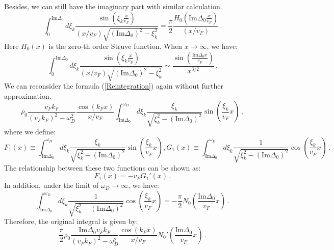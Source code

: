 \documentclass[aps,onecolumn,nofootinbib,superscriptaddress,notitlepage,longbibliography]{revtex4-1}
\begin{document}
Besides, we can still have the imaginary part with similar calculation.
\begin{equation}
\int_{0}^{\text{Im}\Delta_{0}}d\xi_{k}\frac{\sin\left(\xi_{k}\frac{x}{v_{F}}\right)}{(x/v_{F})\sqrt{\left(\text{Im}\Delta_{0}\right)^{2}-\xi_{k}^{2}}}=\frac{\pi}{2}\frac{H_{0}\left(\text{Im}\Delta_{0}\frac{x}{v_{F}}\right)}{(x/v_{F})}\,.
\end{equation}
Here $H_{0}(x)$ is the zero-th order Struve function. When $x\rightarrow\infty$,
we have: 
\begin{equation}
\int_{0}^{\text{Im}\Delta_{0}}d\xi_{k}\frac{\sin\left(\xi_{k}\frac{x}{v_{F}}\right)}{(x/v_{F})\sqrt{\left(\text{Im}\Delta_{0}\right)^{2}-\xi_{k}^{2}}}\sim\frac{\sin(\frac{\text{Im}\Delta_{0}x}{v_{F}})}{x^{3/2}}\,.\label{Imapprox}
\end{equation}
We can reconsider the formula (\ref{Reintegration}) again without
further approximation. 
\begin{equation}
\rho_{0}\frac{v_{F}k_{F}}{(v_{F}k_{F})^{2}-\omega_{D}^{2}}\frac{\cos(k_{F}x)}{x/v_{F}}\int_{\text{Im}\Delta_{0}}^{\omega_{D}}d\xi_{k}\frac{\xi_{k}}{\sqrt{\xi_{k}^{2}-(\text{Im}\Delta_{0})^{2}}}\sin\left(\frac{\xi_{k}}{v_{F}}x\right)\,,
\end{equation}
where we define: 
\begin{equation}
F_{1}(x)\equiv\int_{\text{Im}\Delta_{0}}^{\omega_{D}}d\xi_{k}\frac{\xi_{k}}{\sqrt{\xi_{k}^{2}-(\text{Im}\Delta_{0})^{2}}}\sin\left(\frac{\xi_{k}}{v_{F}}x\right),G_{1}(x)\equiv\int_{\text{Im}\Delta_{0}}^{\omega_{D}}d\xi_{k}\frac{1}{\sqrt{\xi_{k}^{2}-(\text{Im}\Delta_{0})^{2}}}\cos\left(\frac{\xi_{k}}{v_{F}}x\right)\,.
\end{equation}
The relationship between these two functions can be shown as: 
\begin{equation}
F_{1}(x)=-v_{F}G_{1}'(x)\,.
\end{equation}
In addition, under the limit of $\omega_{D}\rightarrow\infty$, we
have: 
\begin{equation}
\int_{\text{Im}\Delta_{0}}^{\omega_{D}}d\xi_{k}\frac{1}{\sqrt{\xi_{k}^{2}-(\text{Im}\Delta_{0})^{2}}}\cos\left(\frac{\xi_{k}}{v_{F}}x\right)=-\frac{\pi}{2}N_{0}\left(\frac{\text{Im}\Delta_{0}}{v_{F}}x\right)\,.
\end{equation}
Therefore, the original integral is given by: 
\begin{equation}
\frac{\pi}{2}\rho_{0}\frac{\text{Im}\Delta_{0}v_{F}k_{F}}{(v_{F}k_{F})^{2}-\omega_{D}^{2}}\frac{\cos(k_{F}x)}{x/v_{F}}N_{0}'\left(\frac{\text{Im}\Delta_{0}}{v_{F}}x\right)\,.
\end{equation}
\end{document}
